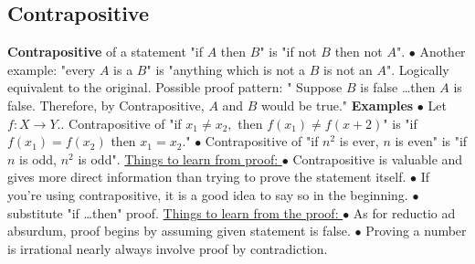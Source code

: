 \documentclass{article}
\begin{document}
\subsection{Contrapositive}
\textbf{Contrapositive} of a statement "if $A$ then $B$" is "if not $B$ then not $A$".
\newline
\newline
$\bullet $ Another example: "every $A$ is a $B$" is "anything which is not a $B$ is not an $A$".
\newline
\newline
Logically equivalent to the original. 
\newline
\newline
Possible proof pattern:
\newline
" Suppose $B$ is false \dots then $A$ is false. Therefore, by Contrapositive, $A$ and $B$ would be true."
\newline
\newline
\textbf{Examples}
\newline
$\bullet $ Let $f: X \rightarrow Y.$. Contrapositive of "if $x_1 \not = x_2,$ then $f(x_1) \not = f(x+2)$" is "if $f(x_1) = f(x_2)$ then $x_1 = x_2$."
\newline
$\bullet $ Contrapositive of "if $n^2$ is ever, $n$ is even" is "if $n$ is odd, $n^2$ is odd".
\newline
\newline
\underline{Things to learn from proof: }
\newline
$\bullet $ Contrapositive is valuable and gives more direct information than trying to prove the statement itself.
\newline
$\bullet $ If you're using contrapositive, it is a good idea to say so in the beginning.
\newline
$\bullet $ substitute "if \dots then" proof.
\newline
{}
\newline
\newline
\underline{Things to learn from the proof: }
\newline
$\bullet $ As for reductio ad absurdum, proof begins by assuming given statement is false.
\newline
$\bullet $ Proving a number is irrational nearly always involve proof by contradiction.
\newpage
\end{document}
